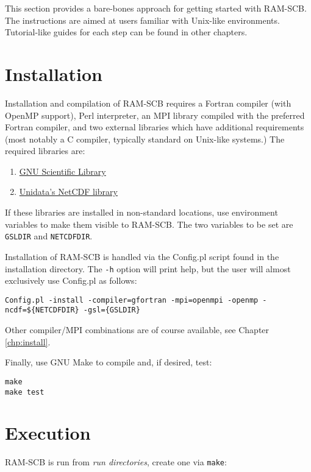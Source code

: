 This section provides a bare-bones approach for getting started with RAM-SCB. The instructions are aimed at users familiar with Unix-like environments. Tutorial-like guides for each step can be found in other chapters.

\section{Installation}

Installation and compilation of RAM-SCB requires a Fortran compiler (with OpenMP support), Perl interpreter, an MPI library compiled with the preferred Fortran compiler, and two external libraries which have additional requirements (most notably a C compiler, typically standard on Unix-like systems.)  The required libraries are:

\begin{enumerate}
\item{\href{https://www.gnu.org/software/gsl}{GNU Scientific Library}}
\item{\href{http://www.unidata.ucar.edu/downloads/netcdf/ftp/netcdf-4.0.1.tar.gz}{Unidata's NetCDF library}}
\end{enumerate}

If these libraries are installed in non-standard locations, use environment variables to make them visible to RAM-SCB. The two variables to be set are {\tt GSLDIR} and {\tt NETCDFDIR}.

Installation of RAM-SCB is handled via the Config.pl script found in the installation directory. The {\tt -h} option will print help, but the user will almost exclusively use Config.pl as follows:

\begin{verbatim}
Config.pl -install -compiler=gfortran -mpi=openmpi -openmp -ncdf=${NETCDFDIR} -gsl={GSLDIR}
\end{verbatim}

Other compiler/MPI combinations are of course available, see Chapter \ref{chp:install}.

Finally, use GNU Make to compile and, if desired, test:

\begin{verbatim}
make
make test
\end{verbatim}

\section{Execution}

RAM-SCB is run from \textit{run directories}, create one via {\tt make}:

